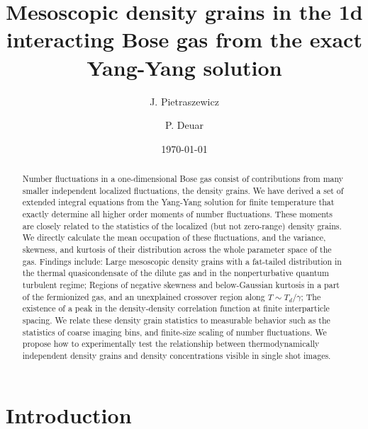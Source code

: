 \documentclass[aps,twocolumn,pra,superscriptaddress,nofootinbib,amsmath,amssymb,floats,floatfix,english]{revtex4-1}
\begin{document}
\title{Mesoscopic density grains in the 1d interacting Bose gas from the exact Yang-Yang solution
}

\author{J. Pietraszewicz}

\author{P. Deuar}

\date{\today}

\begin{abstract}
Number fluctuations in a
one-dimensional Bose gas consist of contributions from many smaller independent localized fluctuations, the density grains.
We have derived a set of extended integral equations from the Yang-Yang solution for finite temperature that exactly determine all higher order moments of number fluctuations.
These moments are closely related to the statistics of the localized (but not zero-range) density grains.
We directly calculate the mean occupation of these fluctuations, and the variance, skewness, and kurtosis of their distribution across the whole parameter space of the gas. 
Findings include: 
Large mesoscopic density grains with a fat-tailed distribution in the thermal quasicondensate of the dilute gas and in the nonperturbative quantum turbulent regime;
Regions of negative skewness and below-Gaussian kurtosis in a part of the fermionized gas, and 
an unexplained crossover region along $T\sim T_d/\gamma$;
The existence of a peak in the density-density correlation function at finite interparticle spacing. 
We relate these density grain statistics to measurable behavior such as the statistics of coarse imaging bins, and finite-size scaling of number fluctuations. We propose how to experimentally test the relationship between thermodynamically independent density grains and density concentrations visible in single shot images. 
\end{abstract}


\maketitle 

\section{Introduction}
\label{INTRO} 
\end{document}
